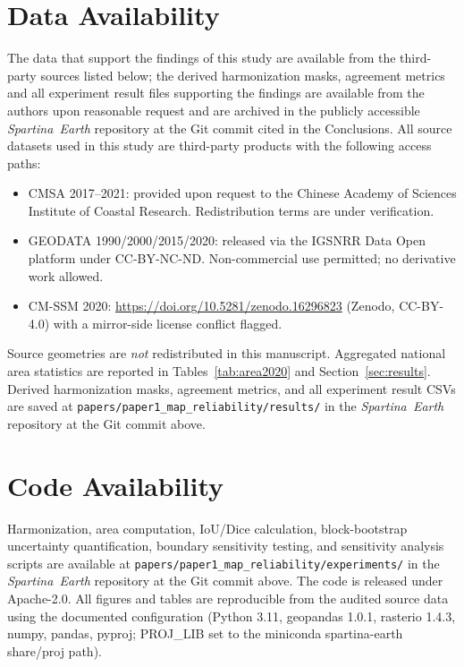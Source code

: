 \documentclass[11pt]{article}
\begin{document}
\section*{Data Availability}
\label{sec:data-availability}

The data that support the findings of this study are available from the
third-party sources listed below; the derived harmonization masks, agreement
metrics and all experiment result files supporting the findings are
available from the authors upon reasonable request and are archived in the
publicly accessible \textit{Spartina~Earth} repository at the Git commit cited
in the Conclusions. All source datasets used in this study are third-party
products with the following access paths:
\begin{itemize}[nosep]
\item CMSA 2017--2021: provided upon request to the Chinese Academy of Sciences
  Institute of Coastal Research. Redistribution terms are under verification.
\item GEODATA 1990/2000/2015/2020: released via the IGSNRR Data Open platform
  under CC-BY-NC-ND. Non-commercial use permitted; no derivative work allowed.
\item CM-SSM 2020: \url{https://doi.org/10.5281/zenodo.16296823} (Zenodo,
  CC-BY-4.0) with a mirror-side license conflict flagged.
\end{itemize}
Source geometries are \emph{not} redistributed in this manuscript. Aggregated
national area statistics are reported in Tables~\ref{tab:area2020} and
Section~\ref{sec:results}. Derived harmonization masks, agreement metrics, and
all experiment result CSVs are saved at
\texttt{papers/paper1\_map\_reliability/results/} in the \textit{Spartina~Earth}
repository at the Git commit above.

\section*{Code Availability}

Harmonization, area computation, IoU/Dice calculation, block-bootstrap
uncertainty quantification, boundary sensitivity testing, and sensitivity
analysis scripts are available at
\texttt{papers/paper1\_map\_reliability/experiments/} in the \textit{Spartina~Earth}
repository at the Git commit above. The code is released under Apache-2.0.
All figures and tables are reproducible from the audited source data using
the documented configuration (Python 3.11, geopandas 1.0.1, rasterio 1.4.3,
numpy, pandas, pyproj; PROJ\_LIB set to the miniconda spartina-earth share/proj
path).
\end{document}
